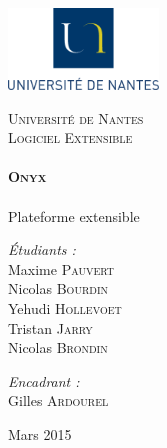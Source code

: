 \begin{titlepage}
 
	 \includegraphics[width=4cm]{figures/UN.png}~\\[1cm]
	\begin{center}
    \textsc{\LARGE Université de Nantes}\\[2cm]

    \textsc{\Large Logiciel Extensible}\\[2cm]

    \HRule \\[0.4cm]
    { \huge \bfseries \textsc{Onyx}\\[0.4cm] }
    \HRule \\[2cm]
    
    {\LARGE Plateforme extensible} 
	\\[6cm]

    \begin{minipage}{0.4\textwidth}
      \large
        \emph{\'Etudiants :}\\
        Maxime \textsc{Pauvert}\\
        Nicolas \textsc{Bourdin}\\
        Yehudi \textsc{Hollevoet}\\
        Tristan \textsc{Jarry}\\
        Nicolas \textsc{Brondin}
    \end{minipage}
    \begin{minipage}{0.4\textwidth}
      \large
        \emph{Encadrant :}\\
         Gilles \textsc{Ardourel}\\
    \end{minipage}

    \vfill

    {\large Mars 2015}

  \end{center}
\end{titlepage}
